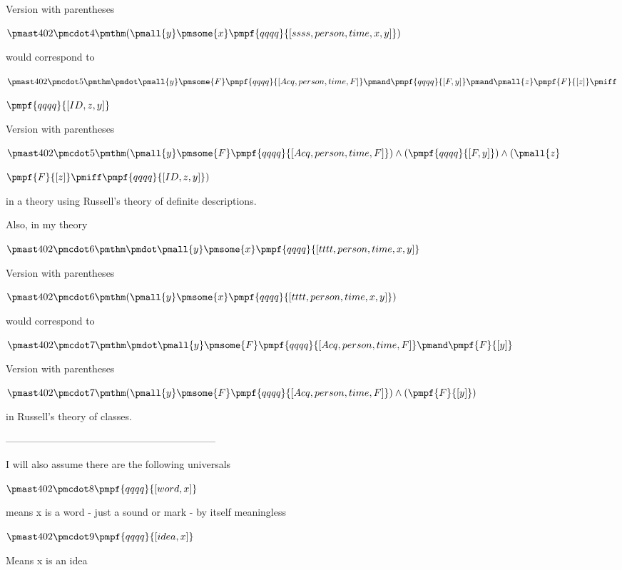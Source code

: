 \documentclass[12pt]{article}
\begin{document}
 

Version with parentheses

$\pmast 402 \pmcdot 4 \pmthm  (  \pmall{y} \pmsome{x} \pmpf{qqqq}{[ssss, person, time, x, y]} )$


would correspond to 

$\pmast 402 \pmcdot 5 \pmthm \pmdot \pmall{y} \pmsome{F} \pmpf{qqqq}{[Acq, person,time,F]} \pmand \pmpf{qqqq}{[F, y]} \pmand \pmall{z} \pmpf{F}{[z]} \pmiff $

$\pmpf{qqqq}{[ID,z,y]} $
 
 

Version with parentheses

$\pmast 402 \pmcdot 5 \pmthm  (  \pmall{y} \pmsome{F} \pmpf{qqqq}{[Acq, person,time,F]} ) \land ( \pmpf{qqqq}{[F, y]} ) \land ( \pmall{z} $

$\pmpf{F}{[z]} \pmiff \pmpf{qqqq}{[ID,z,y]} )$


in a theory using Russell's theory of definite descriptions.

Also, in my theory

$\pmast 402 \pmcdot 6 \pmthm \pmdot \pmall{y} \pmsome{x} \pmpf{qqqq}{[tttt, person, time, x, y]} $
 
 

Version with parentheses

$\pmast 402 \pmcdot 6 \pmthm  (  \pmall{y} \pmsome{x} \pmpf{qqqq}{[tttt, person, time, x, y]} )$


would correspond to

$\pmast 402 \pmcdot 7 \pmthm \pmdot \pmall{y} \pmsome{F} \pmpf{qqqq}{[Acq, person,time,F]} \pmand \pmpf{F}{[y]} $
 
 

Version with parentheses

$\pmast 402 \pmcdot 7 \pmthm  (  \pmall{y} \pmsome{F} \pmpf{qqqq}{[Acq, person,time,F]} ) \land ( \pmpf{F}{[y]} )$


in Russell's theory of classes.

---------------------------------------------------------------

I will also assume there are the following universals

$\pmast 402 \pmcdot 8 \pmpf{qqqq}{[word, x]}$

means x is a word - just a sound or mark - by itself meaningless

$\pmast 402 \pmcdot 9 \pmpf{qqqq}{[idea, x]}$

Means x is an idea
\end{document}
